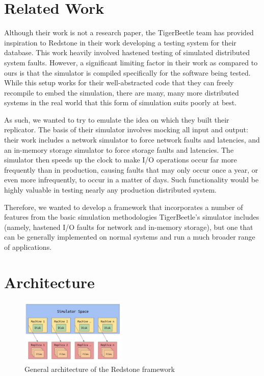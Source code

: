 \section{\txtrsdust Related Work}

{\fontsize{12}{15}\selectfont 
Although their work is not a research paper,
the TigerBeetle team has provided inspiration to Redstone in their work developing a testing system for their database.
This work heavily involved hastened testing of simulated distributed system faults.
However, a significant limiting factor in their work as compared to ours is that the simulator is compiled specifically for the software being tested.
While this setup works for their well-abstracted code that they can freely recompile to embed the simulation,
there are many, many more distributed systems in the real world that this form of simulation suits poorly at best.

As such, we wanted to try to emulate the idea on which they built their replicator.
The basis of their simulator involves mocking all input and output:
their work includes a network simulator to force network faults and latencies,
and an in-memory storage simulator to force storage faults and latencies.
The simulator then speeds up the clock to make I/O operations occur far more frequently than in production,
causing faults that may only occur once a year, or even more infrequently, to occur in a matter of days.
Such functionality would be highly valuable in testing nearly any production distributed system.

Therefore,
we wanted to develop a framework that incorporates a number of features from the basic simulation methodologies
TigerBeetle’s simulator includes (namely, hastened I/O faults for network and in-memory storage),
but one that can be generally implemented on normal systems and run a much broader range of applications.

}

\section{\txtrsdust Architecture}

\begin{figure}
\includegraphics[width=0.45\textwidth]{redstone_architecture.jpeg}
\caption{General architecture of the Redstone framework}
\end{figure}

